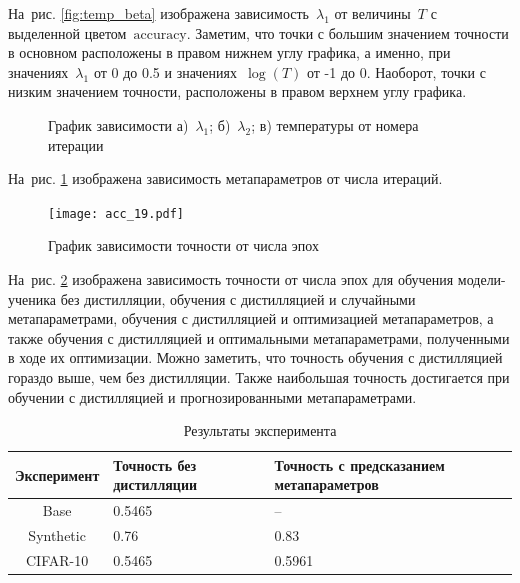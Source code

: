 \documentclass[12pt, twoside]{article}
\begin{document}
На~рис. \ref{fig:temp_beta} изображена зависимость~$\lambda_1$ от величины~$T$ с выделенной цветом~$\text{accuracy}$. Заметим, что точки с большим значением точности в основном расположены в правом нижнем углу графика, а именно, при значениях~$\lambda_1$ от 0 до 0.5 и значениях~$\log(T)$ от -1 до 0. Наоборот, точки с низким значением точности, расположены в правом верхнем углу графика.

\begin{figure}[!ht]
\begin{minipage}[h]{0.5\linewidth}
\end{minipage}
\begin{minipage}[h]{0.5\linewidth}
\end{minipage}
\caption{График зависимости а)~$\lambda_1$; б)~$\lambda_2$; в) температуры от номера итерации}
\label{fig:meta_iter_cifar}
\end{figure}

На~рис. \ref{fig:meta_iter_cifar} изображена зависимость метапараметров от числа итераций. 

\begin{figure}[!ht]
\centering
\texttt{[image: acc\_19.pdf]}
\caption{График зависимости точности от числа эпох}
\label{fig:acc_epoch}
\end{figure}

На~рис. \ref{fig:acc_epoch} изображена зависимость точности от числа эпох для обучения модели-ученика без дистилляции, обучения с дистилляцией и случайными метапараметрами, обучения с дистилляцией и оптимизацией метапараметров, а также обучения с дистилляцией и оптимальными метапараметрами, полученными в ходе их оптимизации. Можно заметить, что точность обучения с дистилляцией гораздо выше, чем без дистилляции. Также наибольшая точность достигается при обучении с дистилляцией и прогнозированными метапараметрами.

\begin{table}[!ht]
    \centering
    \begin{tabular}{|c||p{2.5 cm}|p{5 cm}|}
    \hline
    Эксперимент & Точность без \linebreak дистилляции & Точность с предсказанием \linebreak метапараметров\\
    \hline
    Base  & 0.5465 & -- \\
    Synthetic & 0.76 & 0.83 \\
    CIFAR-10 & 0.5465 & 0.5961 \\
    \hline
    \end{tabular}
    \caption{Результаты эксперимента}
    \label{tab:res}
\end{table}
\end{document}
